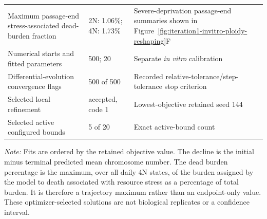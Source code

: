 \begin{table}[!htbp]
\begin{tabular}{@{}p{}p{}p{}@{}}
\midrule
Maximum passage-end stress-associated dead-burden fraction & 2N: 1.06\%; 4N: 1.73\% & Severe-deprivation passage-end summaries shown in Figure~\ref{fig:iteration1-invitro-ploidy-reshaping}F \\
Numerical starts and fitted parameters & 500; 20 & Separate \textit{in vitro} calibration \\
Differential-evolution convergence flags & 500 of 500 & Recorded relative-tolerance/step-tolerance stop criterion \\
Selected local refinement & accepted, code 1 & Lowest-objective retained seed 144 \\
Selected active configured bounds & 5 of 20 & Exact active-bound count \\
\bottomrule
\end{tabular}
\par\vspace{0.5em}
\begin{minipage}{0.96\textwidth}
\footnotesize
\textit{Note:} Fits are ordered by the retained objective value. The decline is the initial minus terminal predicted mean chromosome number. The dead burden percentage is the maximum, over all daily 4N states, of the burden assigned by the model to death associated with resource stress as a percentage of total burden. It is therefore a trajectory maximum rather than an endpoint-only value. These optimizer-selected solutions are not biological replicates or a confidence interval.
\end{minipage}
\end{table}
